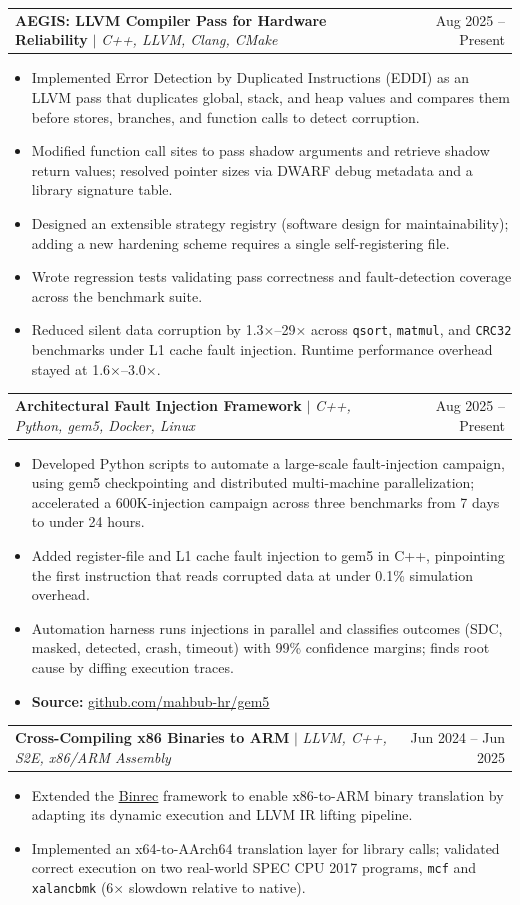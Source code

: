 \documentclass[letterpaper,11pt]{article}
\makeatletter
\newcommand{\resumeItem}[1]{
  \item\small{
    {#1 \vspace{-2pt}}
  }
}
\newcommand{\resumeProjectHeading}[2]{
    \item
    \begin{tabular*}{0.97\textwidth}{l@{\extracolsep{\fill}}r}
      \small#1 & #2 \\
    \end{tabular*}\vspace{-7pt}
}
\newcommand{\resumeItemListStart}{\begin{itemize}}
\newcommand{\resumeItemListEnd}{\end{itemize}\vspace{-5pt}}
\makeatother
\begin{document}
      \resumeProjectHeading
          {\textbf{AEGIS: LLVM Compiler Pass for Hardware Reliability} $|$ \emph{C++, LLVM, Clang, CMake}} {Aug 2025 -- Present}
      \resumeItemListStart
        \resumeItem{Implemented Error Detection by Duplicated Instructions (EDDI) as an LLVM pass that duplicates global, stack, and heap values and compares them before stores, branches, and function calls to detect corruption.}
        \resumeItem{Modified function call sites to pass shadow arguments and retrieve shadow return values; resolved pointer sizes via DWARF debug metadata and a library signature table.}
        \resumeItem{Designed an extensible strategy registry (software design for maintainability); adding a new hardening scheme requires a single self-registering file.}
        \resumeItem{Wrote regression tests validating pass correctness and fault-detection coverage across the benchmark suite.}
        \resumeItem{Reduced silent data corruption by 1.3$\times$--29$\times$ across \texttt{qsort}, \texttt{matmul}, and \texttt{CRC32} benchmarks under L1 cache fault injection. Runtime performance overhead stayed at 1.6$\times$--3.0$\times$.}
      \resumeItemListEnd

      \resumeProjectHeading
          {\textbf{Architectural Fault Injection Framework} $|$ \emph{C++, Python, gem5, Docker, Linux}} {Aug 2025 -- Present}
      \resumeItemListStart
        \resumeItem{Developed Python scripts to automate a large-scale fault-injection campaign, using gem5 checkpointing and distributed multi-machine parallelization; accelerated a 600K-injection campaign across three benchmarks from 7 days to under 24 hours.}
        \resumeItem{Added register-file and L1 cache fault injection to gem5 in C++, pinpointing the first instruction that reads corrupted data at under 0.1\% simulation overhead.}
        \resumeItem{Automation harness runs injections in parallel and classifies outcomes (SDC, masked, detected, crash, timeout) with 99\% confidence margins; finds root cause by diffing execution traces.}
        \resumeItem{\textbf{Source:} \href{https://github.com/mahbub-hr/gem5.git}{\underline{github.com/mahbub-hr/gem5}}}
      \resumeItemListEnd

      \resumeProjectHeading
          {\textbf{Cross-Compiling x86 Binaries to ARM} $|$ \emph{LLVM, C++, S2E, x86/ARM Assembly}}{Jun 2024 -- Jun 2025}
          \resumeItemListStart
            \resumeItem{Extended the \href{https://github.com/trailofbits/binrec-tob}{\underline{Binrec}} framework to enable x86-to-ARM binary translation by adapting its dynamic execution and LLVM IR lifting pipeline.}
            \resumeItem{Implemented an x64-to-AArch64 translation layer for library calls; validated correct execution on two real-world SPEC CPU 2017 programs, \texttt{mcf} and \texttt{xalancbmk} (6$\times$ slowdown relative to native).}
          \resumeItemListEnd
\end{document}

